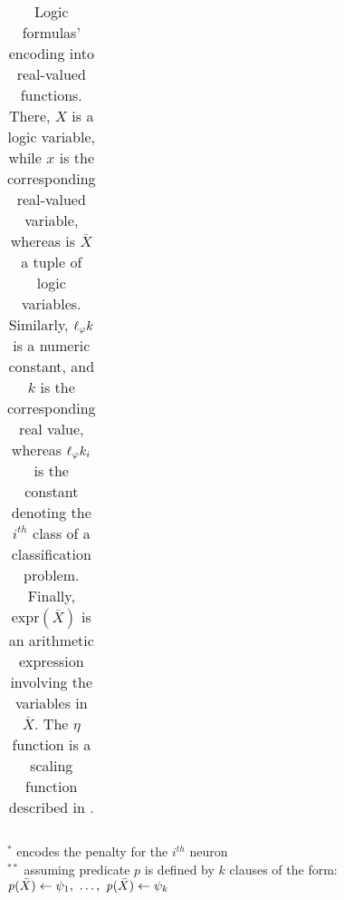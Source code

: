 \begin{table}
\begin{tabular}{l|r||cl|r}
    \end{tabular}
    \begin{center}\scriptsize
        $^{*}$ encodes the penalty for the $i^{th}$ neuron
        \\
        \smallskip
        $^{**}$ assuming predicate $p$ is defined by $k$ clauses of the form:
        \\
        $\pred{p}(\bar{X}) \leftarrow \psi_1,\ \ldots,\ \pred{p}(\bar{X}) \leftarrow \psi_k$
    \end{center}
    \caption[KILL Fuzzifier: Logic Formulae Encoding]{
        Logic formulas' encoding into real-valued functions.
        There, $X$ is a logic variable, while $x$ is the corresponding real-valued variable, whereas is $\bar{X}$ a tuple of logic variables.
        Similarly, $\ell_{\varphi}{k}$ is a numeric constant, and $k$ is the corresponding real value, whereas $\ell_{\varphi}{k}_i$ is the constant denoting the $i^{th}$ class of a classification problem.
        Finally, $\text{expr}(\bar{X})$ is an arithmetic expression involving the variables in $\bar{X}$.
        The $\eta$ function is a scaling function described in .
    }
    \label{tab:kill-logic-formulae}
\end{table}